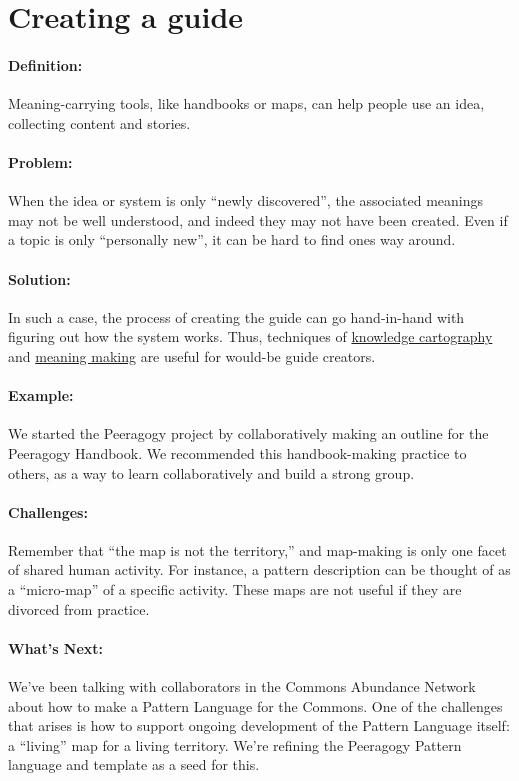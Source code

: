 \section{Creating a guide}
\paragraph{Definition:} Meaning-carrying tools, like handbooks or maps, can
help people use an idea, collecting content and stories.

\paragraph{Problem:} When the idea or system is only ``newly discovered'',
the associated meanings may not be well understood, and indeed they may
not have been created. Even if a topic is only ``personally new'', it
can be hard to find ones way around.

\paragraph{Solution:} In such a case, the process of creating the guide can
go hand-in-hand with figuring out how the system works. Thus, techniques
of \href{http://knowledgecartography.org/}{knowledge cartography}
and \href{http://www.hitl.washington.edu/publications/r-97-47/two.html}{meaning
making} are useful for would-be guide creators.

\paragraph{Example:} We started the Peeragogy project by collaboratively
making an outline for the Peeragogy Handbook. We recommended this
handbook-making practice to others, as a way to learn collaboratively
and build a strong group.

\paragraph{Challenges:} Remember that ``the map is not the territory,'' and
map-making is only one facet of shared human activity. For instance, a
pattern description can be thought of as a ``micro-map'' of a specific
activity. These maps are not useful if they are divorced from practice.

\paragraph{What's Next:} We've been talking with collaborators in the
Commons Abundance Network about how to make a Pattern Language for the
Commons. One of the challenges that arises is how to support ongoing
development of the Pattern Language itself: a ``living'' map for a
living territory. We're refining the Peeragogy Pattern language and
template as a seed for this.
